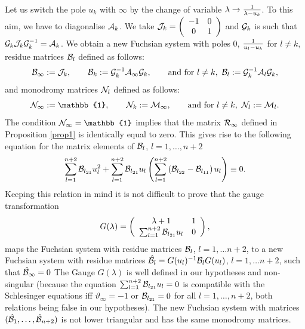 \documentclass[12pt]{article}
\def\thi{{\vartheta_\infty}}
\newcommand{\ID}{\mathbb{1}}
\theoremstyle{definition}
\theoremstyle{theorem}
\begin{document}
Let us switch the pole $u_k$ with $\infty$
by the change of variable $\lambda\to{1\over \lambda-u_k}$. To this 
aim, we have to diagonalise ${\cal A}_k$. We take
${\cal J}_k=\left(\begin{array}{cc}-1&0\\ 0&1\end{array}\right)$ 
and ${\cal G}_k$ is such that 
${\cal G}_k{\cal J}_k{\cal G}_k^{-1}={\cal A}_k$. We obtain
a new Fuchsian system with poles $0$, ${1\over u_l-u_k}$ for 
$l\neq k$, residue matrices ${\cal B}_l$ defined as follows:
$$
{\cal B}_\infty:={\cal J}_k,\qquad
{\cal B}_k:= {\cal G}_k^{-1}{\cal A}_\infty {\cal G}_k, 
\qquad\hbox{and for $l\neq k$, }\,
{\cal B}_l:= {\cal G}_k^{-1} {\cal A}_l {\cal G}_k,
$$
and monodromy matrices ${\cal N}_l$ defined as follows:
$$
{\cal N}_\infty:=\ID,\qquad
{\cal  N}_k:={\cal M}_\infty,\qquad
\hbox{and for $l\neq k$, }\,
{\cal N}_l:= {\cal M}_l.
$$
The condition ${\cal N}_\infty=\ID$ implies that the matrix 
${\cal R}_\infty$ defined in Proposition \ref{prop1} is identically 
equal to zero. This gives rise to the following equation for the 
matrix elements of ${\cal B}_l$, $l=1,\dots,n+2$
$$
\sum_{l=1}^{n+2}{\cal B}_{l_{21}} u_l^2+
\sum_{l=1}^{n+2}{\cal B}_{l_{21}} u_l\left(
\sum_{l=1}^{n+2}\left({\cal B}_{l_{22}}-
{\cal B}_{l_{11}}\right) u_l\right)\equiv 0.
$$
Keeping this relation in mind it is not difficult to prove that
the gauge transformation
$$
G(\lambda)=\left(\begin{array}{cc}
\lambda+1 & 1\\
\sum_{l=1}^{n+2}{\cal B}_{l_{21}} u_l &0\\
\end{array}\right),
$$
maps the Fuchsian system with residue matrices ${\cal B}_l$, 
$l=1,\dots n+2$, to a new Fuchsian system with residue matrices 
$\hat{\cal B}_l=G(u_l)^{-1} {\cal B}_l G(u_l)$, $l=1,\dots n+2$,
such that $\hat{\cal B}_\infty=0$ 
The Gauge $G(\lambda)$ is well defined in our hypotheses
and non-singular (because the  equation 
$\sum_{l=1}^{n+2}{\cal B}_{l_{21}} u_l=0$ is compatible with
the Schlesinger equations iff $\thi=-1$ or ${\cal B}_{l_{21}}=0$ for 
all $l=1,\dots,n+2$, both relations being false in our hypotheses).
The new Fuchsian system with matrices
$(\hat{\cal B}_1,\dots,\hat{\cal B}_{n+2})$ is not lower triangular and 
has the same monodromy matrices. 
\end{document}
